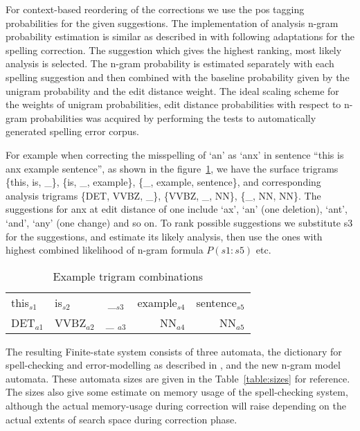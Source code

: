 \documentclass{llncs}
\begin{document}
For context-based reordering of the corrections we use the pos tagging
probabilities for the given suggestions. The implementation of analysis n-gram
probability estimation is similar as described in \cite{silfverberg/2011} with
following adaptations for the spelling correction. The suggestion which gives
the highest ranking, most likely analysis is selected.  The n-gram probability
is estimated separately with each spelling suggestion and then combined with
the baseline probability given by the unigram probability and the edit distance
weight. The ideal scaling scheme for the weights of unigram probabilities,
edit distance probabilities with respect to n-gram probabilities was acquired
by performing the tests to automatically generated spelling error corpus.

For example when correcting the misspelling of `an' as `anx' in sentence ``this
is anx example sentence'', as shown in the figure~\ref{fig:example}, we have
the surface trigrams \{this, is, \_\}, \{is, \_, example\}, \{\_, example,
sentence\}, and corresponding analysis trigrams \{DET, VVBZ, \_\}, \{VVBZ, \_,
NN\}, \{\_, NN, NN\}. The suggestions for anx at edit distance of one include
`ax', `an' (one deletion), `ant', `and', `any' (one change) and so on. To rank
possible suggestions we substitute s3 for the suggestions, and estimate its
likely analysis, then use the ones with highest combined likelihood of n-gram
formula $P(s1:s5)$ etc.

\begin{table}
\caption{Example trigram combinations\label{fig:example}}
\begin{center}
\begin{tabular}{llcrr}
\hline
this$_{s1}$ & is$_{s2}$ & \_$_{s3}$ & example$_{s4}$ & sentence$_{s5}$\\
DET$_{a1}$ & VVBZ$_{a2}$ & \_ $_{a3}$& NN$_{a4}$ & NN$_{a5}$\\
\hline
\end{tabular}
\end{center}
\end{table}

The resulting Finite-state system consists of three automata, the dictionary
for spell-checking and error-modelling as described in
\cite{pirinen/2010/lrec}, and the new n-gram model automata. These automata
sizes are given in the Table~\ref{table:sizes} for reference. The sizes also
give some estimate on memory usage of the spell-checking system, although the
actual memory-usage during correction will raise depending on the actual
extents of search space during correction phase.
\end{document}
